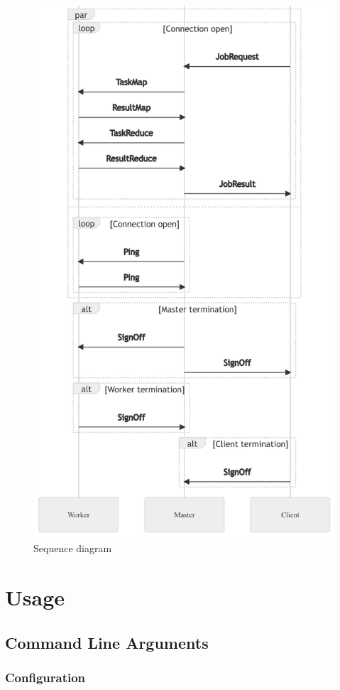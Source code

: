 \documentclass[12pt, letterpaper]{article}
\begin{document}
\begin{figure}[hp]
	\centering
	\includegraphics[width=0.75\linewidth]{img/SequenceDiagramPart2}
	\caption{Sequence diagram}
	\label{fig:sequenceDiagramPart2}
\end{figure}

\section{Usage}
\label{usage}

\subsection{Command Line Arguments}

\subsubsection{Configuration}


\newpage
\end{document}
